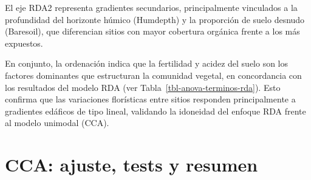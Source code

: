 \documentclass[
  spanish,
  11pt,
  a4paper,
  DIV=11,
  numbers=noendperiod]{scrartcl}
\begin{document}
El eje RDA2 representa gradientes secundarios, principalmente vinculados
a la profundidad del horizonte húmico (Humdepth) y la proporción de
suelo desnudo (Baresoil), que diferencian sitios con mayor cobertura
orgánica frente a los más expuestos.

En conjunto, la ordenación indica que la fertilidad y acidez del suelo
son los factores dominantes que estructuran la comunidad vegetal, en
concordancia con los resultados del modelo RDA (ver
Tabla~\ref{tbl-anova-terminos-rda}). Esto confirma que las variaciones
florísticas entre sitios responden principalmente a gradientes edáficos
de tipo lineal, validando la idoneidad del enfoque RDA frente al modelo
unimodal (CCA).

\section{CCA: ajuste, tests y resumen}\label{cca-ajuste-tests-y-resumen}
\end{document}
